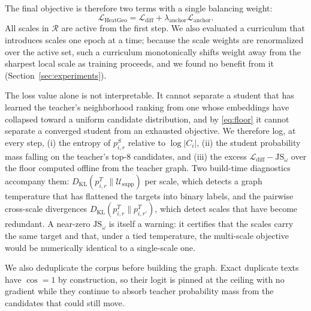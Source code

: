 The final objective is therefore two terms with a single balancing weight:
\begin{equation}
    \mathcal{L}_{\mathrm{HeatGeo}}
    =
    \mathcal{L}_{\mathrm{diff}}
    +
    \lambda_{\mathrm{anchor}}\mathcal{L}_{\mathrm{anchor}}.
\end{equation}
All scales in $\mathcal{R}$ are active from the first step. We also evaluated a curriculum that introduces scales one epoch at a time; because the scale weights are renormalized over the active set, such a curriculum monotonically shifts weight away from the sharpest local scale as training proceeds, and we found no benefit from it (Section~\ref{sec:experiments}).

The loss value alone is not interpretable. It cannot separate a student that has learned the teacher's neighborhood ranking from one whose embeddings have collapsed toward a uniform candidate distribution, and by \eqref{eq:floor} it cannot separate a converged student from an exhausted objective. We therefore log, at every step, (i) the entropy of $p_{i,r}^S$ relative to $\log|C_i|$, (ii) the student probability mass falling on the teacher's top-8 candidates, and (iii) the excess $\mathcal{L}_{\mathrm{diff}}-\mathrm{JS}_\omega$ over the floor computed offline from the teacher graph. Two build-time diagnostics accompany them: $D_{\mathrm{KL}}(p_{i,r}^T\|\mathcal{U}_{\mathrm{supp}})$ per scale, which detects a graph temperature that has flattened the targets into binary labels, and the pairwise cross-scale divergences $D_{\mathrm{KL}}(p_{i,r}^T\|p_{i,r'}^T)$, which detect scales that have become redundant. A near-zero $\mathrm{JS}_\omega$ is itself a warning: it certifies that the scales carry the same target and that, under a tied temperature, the multi-scale objective would be numerically identical to a single-scale one.

We also deduplicate the corpus before building the graph. Exact duplicate texts have $\cos=1$ by construction, so their logit is pinned at the ceiling with no gradient while they continue to absorb teacher probability mass from the candidates that could still move.

